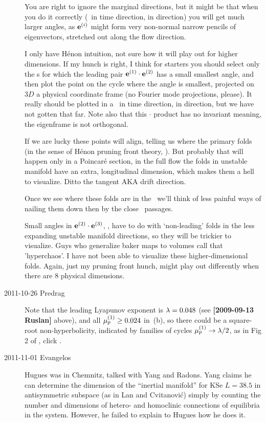 \begin{description}
You are right to ignore the marginal directions, but it might be that
when you do it correctly (\Poincare\ in time direction, \slice in 
direction) you will get much larger angles, as $\jEigvec[i]$ might form
very non-normal narrow pencils of eigenvectors, stretched out along the
flow direction.

I only have H\'enon intuition, not sure how it will play out for higher
dimensions. If my hunch is right, I think for starters you should select
only the \po s for which the leading pair $\jEigvec[1] \cdot \jEigvec[2]$
has a small smallest angle, and then plot the point on the cycle where
the angle is smallest, projected on $3D$ a physical coordinate
frame (no Fourier mode projections, please). It really
should be plotted in a \Poincare\ in time direction, \slice in 
direction, but we have not gotten that far. Note also that this $\cdot$
product has no invariant meaning, the eigenframe is not orthogonal.

If we are lucky these points
will align, telling us where the primary folds (in the sense of H\'enon
pruning front theory, ). But probably that will happen
only in a Poincar\'e section, in the full flow the folds in unstable
manifold have an extra, longitudinal dimension, which makes them a hell
to visualize. Ditto the  tangent AKA drift direction.

Once we see where these folds are in the \statesp\ we'll think of less
painful ways of nailing them down then by the close \po\ passages.

Small angles in $\jEigvec[2] \cdot \jEigvec[3]$, \etc, have to do with
`non-leading' folds in the less expanding unstable manifold directions,
so they will be trickier to visualize. Guys who generalize baker maps to
volumes call that 'hyperchaos'. I have not been able to visualize these
higher-dimensional folds. Again, just my pruning front hunch, might play
out differently when there are 8 physical dimensions.

\item[2011-10-26 Predrag] Note that the leading Lyapunov exponent is
$\Lyap = 0.048$ (see {\bf [2009-09-13 Ruslan]} above), and all
$\eigRe[1]_p \geq 0.024$ in \,(b), so there
could be a square-root non-hyperbolicity, indicated by families of cycles
$\eigRe[1]_p \to \Lyap/2$, as in Fig 2  of , click
.

\item[2011-11-01 Evangelos] Hugues was in Chemnitz, talked with Yang and Radons. 
Yang claims he can determine the dimension of the ``inertial manifold'' for
KSe $L=38.5$ in antisymmetric subspace (as in Lan and Cvitanovi\'c)
simply by counting the number and dimensions of hetero- and homoclinic connections of
equilibria in the system. However, he failed to explain to Hugues how he does it.


\end{description}
